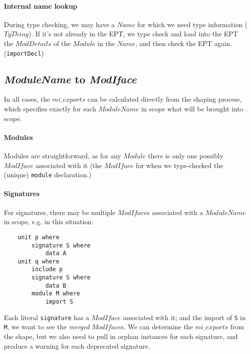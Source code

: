 \documentclass{article}
\newcommand{\I}[1]{\ensuremath{\mathit{#1}}}
\begin{document}
\paragraph{Internal name lookup}  During type checking, we may have
a \I{Name} for which we need type information (\I{TyThing}).  If it's not already in the
EPT, we type check and load
into the EPT the \I{ModDetails} of the \I{Module} in the \I{Name},
and then check the EPT again. (\verb|importDecl|)

\subsection{\textit{ModuleName} to \textit{ModIface}}

In all cases, the \I{mi\_exports} can be calculated directly from the
shaping process, which specifies exactly for each \I{ModuleName} in scope
what will be brought into scope.

\paragraph{Modules} Modules are straightforward, as for any
\I{Module} there is only one possibly \I{ModIface} associated
with it (the \I{ModIface} for when we type-checked the (unique) \verb|module|
declaration.)

\paragraph{Signatures} For signatures, there may be multiple \I{ModIface}s
associated with a \I{ModuleName} in scope, e.g. in this situation:

\begin{verbatim}
    unit p where
        signature S where
            data A
    unit q where
        include p
        signature S where
            data B
        module M where
            import S
\end{verbatim}
%
Each literal \verb|signature| has a \I{ModIface} associated with it; and
the import of \verb|S| in \verb|M|, we want to see the \emph{merged}
\I{ModIface}s.  We can determine the \I{mi\_exports} from the shape,
but we also need to pull in orphan instances for each signature, and
produce a warning for each deprecated signature.
\end{document}
